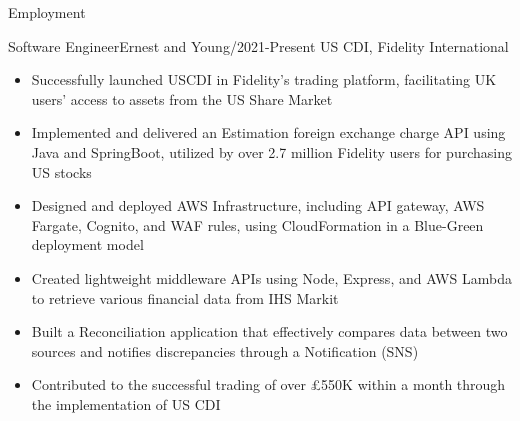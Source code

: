 \documentclass[]{mcdowellcv}
\begin{document}
    \begin{cvsection}{Employment}
        \begin{cvsubsection}{Software Engineer}{Ernest and Young}{/2021-Present}
            US CDI,	Fidelity International
            \begin{itemize}
                \item Successfully launched USCDI in Fidelity's trading platform, facilitating UK users' access to assets from the US Share Market
                \item Implemented and delivered an Estimation foreign exchange charge API using Java and SpringBoot, utilized by over 2.7 million Fidelity users for purchasing US stocks
                \item Designed and deployed AWS Infrastructure, including API gateway, AWS Fargate, Cognito, and WAF rules, using CloudFormation in a Blue-Green deployment model
                \item Created lightweight middleware APIs using Node, Express, and AWS Lambda to retrieve various financial data from IHS Markit
                \item Built a Reconciliation application that effectively compares data between two sources and notifies discrepancies through a Notification (SNS)
                \item Contributed to the successful trading of over £550K within a month through the implementation of US CDI
            \end{itemize}
        \end{cvsubsection}


\end{cvsection}
\end{document}
